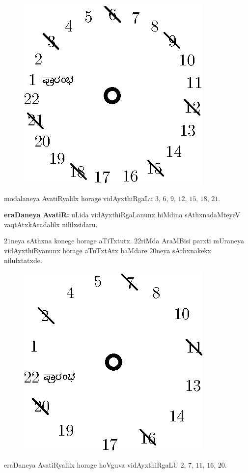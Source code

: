 \begin{figure}[H]
\centering
\includegraphics[scale=0.8]{src/figures/fig9.eps}
\end{figure}
 

modalaneya AvatiRyalilx horage vidAyxthiRgaLu $3$, $6$, $9$, $12$, $15$, $18$, $21$.

{\bf eraDaneya AvatiR:} uLida vidAyxthiRgaLanunx hiMdina sAthxnadaMteyeV vaqtAtxkAradalilx nililxsidaru.

$21$neya sAthxna konege horage aTiTxtutx. $22$riMda AraMBisi parxti mUraneya vidAyxthiRyanunx horage aTuTxtAtx baMdare $20$neya sAthxnakekx nilulxtatxde. 
\begin{figure}[H]
\centering
\includegraphics[scale=0.8]{src/figures/fig10.eps}
\end{figure}
eraDaneya AvatiRyalilx horage hoVguva vidAyxthiRgaLU $2$, $7$, $11$, $16$, $20$.

